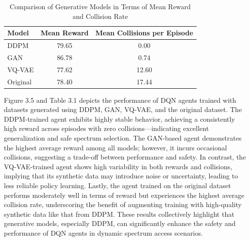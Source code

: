 \begin{table}[ht]
    \centering
    \caption{Comparison of Generative Models in Terms of Mean Reward and Collision Rate}
    \begin{tabular}{|l|c|c|}
    \hline
    \textbf{Model} & \textbf{Mean Reward} & \textbf{Mean Collisions per Episode} \\
    \hline
    DDPM     & 79.65   & 0.00    \\
    GAN      & 86.78   & 0.74    \\
    VQ-VAE   & 77.62   & 12.60   \\
    Original & 78.40   & 17.44   \\
    \hline
    \end{tabular}
    \label{tab:reward_collision_comparison}
\end{table}
   
    Figure 3.5 and Table 3.1 depicts the performance of DQN agents trained with datasets generated using DDPM, GAN, VQ-VAE, and the original dataset. The DDPM-trained agent exhibits highly stable behavior, achieving a consistently high reward across episodes with zero collisions—indicating excellent generalization and safe spectrum selection. The GAN-based agent demonstrates the highest average reward among all models; however, it incurs occasional collisions, suggesting a trade-off between performance and safety. In contrast, the VQ-VAE-trained agent shows high variability in both rewards and collisions, implying that its synthetic data may introduce noise or uncertainty, leading to less reliable policy learning. Lastly, the agent trained on the original dataset performs moderately well in terms of reward but experiences the highest average collision rate, underscoring the benefit of augmenting training with high-quality synthetic data like that from DDPM. These results collectively highlight that generative models, especially DDPM, can significantly enhance the safety and performance of DQN agents in dynamic spectrum access scenarios.

